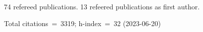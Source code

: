 74 refereed publications. 13 refeered publications as first author.

Total citations~=~3319; h-index~=~32 (2023-06-20)